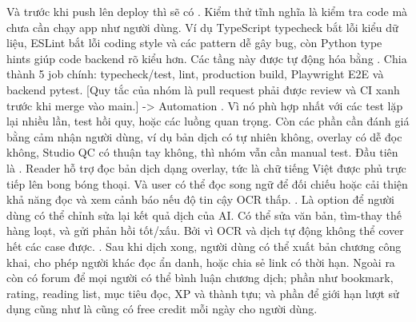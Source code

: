 {}Và trước khi push lên deploy thì sẽ có . Kiểm thử tĩnh nghĩa là kiểm tra code mà chưa cần chạy app như người dùng. Ví dụ TypeScript typecheck bắt lỗi kiểu dữ liệu, ESLint bắt lỗi coding style và các pattern dễ gây bug, còn Python type hints giúp code backend rõ kiểu hơn.\markdownRendererParagraphSeparator
{}Các tầng này được tự động hóa bằng . Chia thành  5 job chính: typecheck/test, lint, production build, Playwright E2E và backend pytest.\markdownRendererParagraphSeparator
{}[Quy tắc của nhóm là pull request phải được review và CI xanh trước khi merge vào main.]\markdownRendererParagraphSeparator
{}-> Automation . Vì nó phù hợp nhất với các test lặp lại nhiều lần, test hồi quy, hoặc các luồng quan trọng. Còn các phần cần đánh giá bằng cảm nhận người dùng, ví dụ bản dịch có tự nhiên không, overlay có dễ đọc không, Studio QC có thuận tay không, thì nhóm vẫn cần manual test.\markdownRendererInterblockSeparator
{}
\markdownRendererSectionEnd \markdownRendererSectionBegin
{}\markdownRendererInterblockSeparator
{}Đầu tiên là . Reader hỗ trợ đọc bản dịch dạng overlay, tức là chữ tiếng Việt được phủ trực tiếp lên bong bóng thoại. Và user có thể đọc song ngữ để đối chiếu hoặc cải thiện khả năng đọc và xem cảnh báo nếu độ tin cậy OCR thấp.\markdownRendererParagraphSeparator
{}. Là option để người dùng có thể chỉnh sửa lại kết quả dịch của AI. Có thể sửa văn bản, tìm-thay thế hàng loạt, và gửi phản hồi tốt/xấu. Bởi vì OCR và dịch tự động không thể cover hết các case được.\markdownRendererParagraphSeparator
{}. Sau khi dịch xong, người dùng có thể xuất bản chương công khai, cho phép người khác đọc ẩn danh, hoặc chia sẻ link có thời hạn.\markdownRendererParagraphSeparator
{}Ngoài ra còn có forum để mọi người có thể bình luận chương dịch; phần  như bookmark, rating, reading list, mục tiêu đọc, XP và thành tựu; và phần  để giới hạn lượt sử dụng cũng như là cũng có free credit mỗi ngày cho người dùng.\markdownRendererInterblockSeparator
{}
\markdownRendererSectionEnd \markdownRendererSectionBegin
{}\markdownRendererInterblockSeparator
